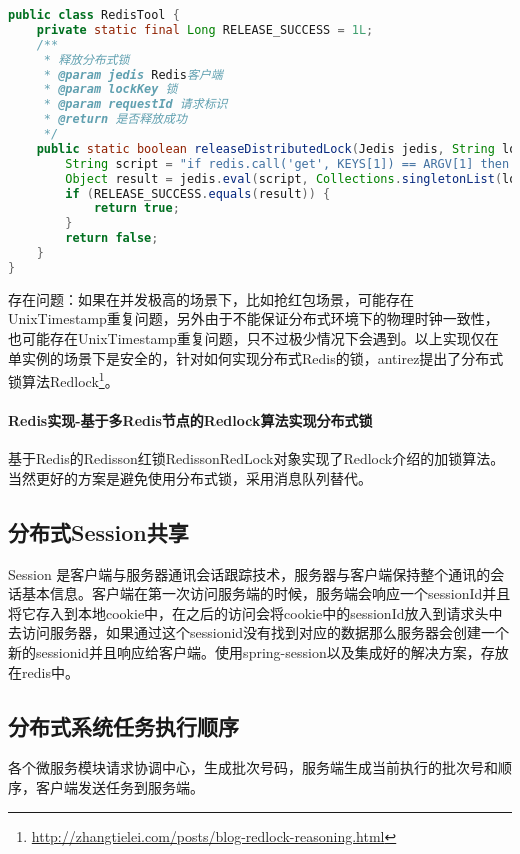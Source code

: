\documentclass[../../../interview-questions.tex]{subfiles}
\begin{document}
\begin{lstlisting}[language=Java]
public class RedisTool {
    private static final Long RELEASE_SUCCESS = 1L;
    /**
     * 释放分布式锁
     * @param jedis Redis客户端
     * @param lockKey 锁
     * @param requestId 请求标识
     * @return 是否释放成功
     */
    public static boolean releaseDistributedLock(Jedis jedis, String lockKey, String requestId) {
        String script = "if redis.call('get', KEYS[1]) == ARGV[1] then return redis.call('del', KEYS[1]) else return 0 end";
        Object result = jedis.eval(script, Collections.singletonList(lockKey), Collections.singletonList(requestId));
        if (RELEASE_SUCCESS.equals(result)) {
            return true;
        }
        return false;
    }
}
\end{lstlisting}

存在问题：如果在并发极高的场景下，比如抢红包场景，可能存在UnixTimestamp重复问题，另外由于不能保证分布式环境下的物理时钟一致性，也可能存在UnixTimestamp重复问题，只不过极少情况下会遇到。以上实现仅在单实例的场景下是安全的，针对如何实现分布式Redis的锁，antirez提出了分布式锁算法Redlock\footnote{\url{http://zhangtielei.com/posts/blog-redlock-reasoning.html}}。

\paragraph{Redis实现-基于多Redis节点的Redlock算法实现分布式锁}

基于Redis的Redisson红锁RedissonRedLock对象实现了Redlock介绍的加锁算法。当然更好的方案是避免使用分布式锁，采用消息队列替代。

\subsection{分布式Session共享}

Session 是客户端与服务器通讯会话跟踪技术，服务器与客户端保持整个通讯的会话基本信息。客户端在第一次访问服务端的时候，服务端会响应一个sessionId并且将它存入到本地cookie中，在之后的访问会将cookie中的sessionId放入到请求头中去访问服务器，如果通过这个sessionid没有找到对应的数据那么服务器会创建一个新的sessionid并且响应给客户端。使用spring-session以及集成好的解决方案，存放在redis中。

\subsection{分布式系统任务执行顺序}

各个微服务模块请求协调中心，生成批次号码，服务端生成当前执行的批次号和顺序，客户端发送任务到服务端。
\end{document}
